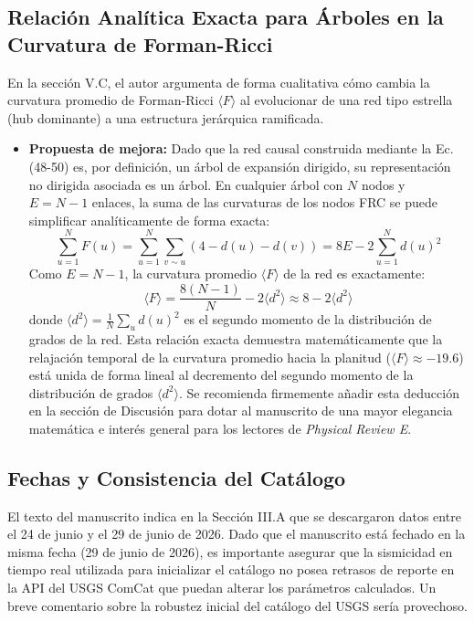 \documentclass[11pt]{article}
\begin{document}
\subsection{Relación Analítica Exacta para Árboles en la Curvatura de Forman-Ricci}
En la sección V.C, el autor argumenta de forma cualitativa cómo cambia la curvatura promedio de Forman-Ricci $\langle F \rangle$ al evolucionar de una red tipo estrella (hub dominante) a una estructura jerárquica ramificada. 
\begin{itemize}
    \item \textbf{Propuesta de mejora:} Dado que la red causal construida mediante la Ec. (48-50) es, por definición, un árbol de expansión dirigido, su representación no dirigida asociada es un árbol. En cualquier árbol con $N$ nodos y $E = N - 1$ enlaces, la suma de las curvaturas de los nodos FRC se puede simplificar analíticamente de forma exacta:
    \begin{equation}
    \sum_{u=1}^N F(u) = \sum_{u=1}^N \sum_{v \sim u} (4 - d(u) - d(v)) = 8E - 2 \sum_{u=1}^N d(u)^2
    \end{equation}
    Como $E = N - 1$, la curvatura promedio $\langle F \rangle$ de la red es exactamente:
    \begin{equation}
    \langle F \rangle = \frac{8(N-1)}{N} - 2 \langle d^2 \rangle \approx 8 - 2 \langle d^2 \rangle
    \end{equation}
    donde $\langle d^2 \rangle = \frac{1}{N}\sum_u d(u)^2$ es el segundo momento de la distribución de grados de la red.  
    Esta relación exacta demuestra matemáticamente que la relajación temporal de la curvatura promedio hacia la planitud ($\langle F \rangle \approx -19.6$) está unida de forma lineal al decremento del segundo momento de la distribución de grados $\langle d^2 \rangle$. Se recomienda firmemente añadir esta deducción en la sección de Discusión para dotar al manuscrito de una mayor elegancia matemática e interés general para los lectores de \textit{Physical Review E}.
\end{itemize}

\subsection{Fechas y Consistencia del Catálogo}
El texto del manuscrito indica en la Sección III.A que se descargaron datos entre el 24 de junio y el 29 de junio de 2026. Dado que el manuscrito está fechado en la misma fecha (29 de junio de 2026), es importante asegurar que la sismicidad en tiempo real utilizada para inicializar el catálogo no posea retrasos de reporte en la API del USGS ComCat que puedan alterar los parámetros calculados. Un breve comentario sobre la robustez inicial del catálogo del USGS sería provechoso.
\end{document}
